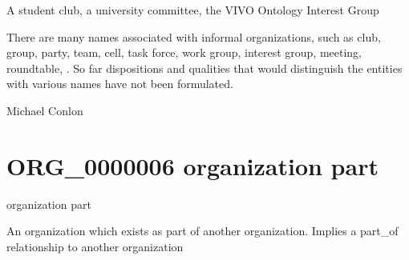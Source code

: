 \documentclass[letterpaper,10pt,english]{sphinxmanual}
\begin{document}
\begin{sphinxShadowBox}

\sphinxAtStartPar
A student club, a university committee, the VIVO Ontology Interest Group
\end{sphinxShadowBox}

\begin{sphinxShadowBox}

\sphinxAtStartPar
There are many names associated with informal organizations, such as club, group, party, team, cell, task force, work group, interest group, meeting, roundtable, .  So far dispositions and qualities that would distinguish the entities with various names have not been formulated.
\end{sphinxShadowBox}

\begin{sphinxShadowBox}

\sphinxAtStartPar
Michael Conlon 
\end{sphinxShadowBox}
\begin{quote}
\label{\detokenize{doc-ORG_0000006:org-0000006}}\label{\detokenize{doc-ORG_0000006:organization-part}}\label{\detokenize{doc-ORG_0000006:org-0000006}}
\ignorespaces \end{quote}


\section{ORG\_0000006 \sphinxhyphen{} organization part}
\label{\detokenize{doc-ORG_0000006:org-0000006-organization-part}}\label{\detokenize{doc-ORG_0000006:index-0}}\label{\detokenize{doc-ORG_0000006::doc}}
\begin{sphinxShadowBox}

\sphinxAtStartPar
organization part
\end{sphinxShadowBox}

\begin{sphinxShadowBox}

\sphinxAtStartPar
An organization which exists as part of another organization.  Implies a part\_of relationship to another organization
\end{sphinxShadowBox}
\end{document}
